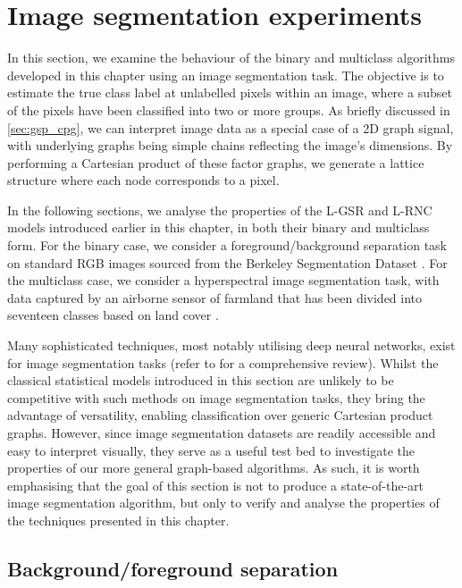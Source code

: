\section{Image segmentation experiments}

\label{sec:logistic_rnc_application}

In this section, we examine the behaviour of the binary and multiclass algorithms developed in this chapter using an image segmentation task. The objective is to estimate the true class label at unlabelled pixels within an image, where a subset of the pixels have been classified into two or more groups. As briefly discussed in \cref{sec:gsp_cpg}, we can interpret image data as a special case of a 2D graph signal, with underlying graphs being simple chains reflecting the image's dimensions. By performing a Cartesian product of these factor graphs, we generate a lattice structure where each node corresponds to a pixel.

In the following sections, we analyse the properties of the L-GSR and L-RNC models introduced earlier in this chapter, in both their binary and multiclass form. For the binary case, we consider a foreground/background separation task on standard RGB images sourced from the Berkeley Segmentation Dataset \citep{Martin2001}. For the multiclass case, we consider a hyperspectral image segmentation task, with data captured by an airborne sensor of farmland that has been divided into seventeen classes based on land cover \citep{Baumgardner2015}. 


Many sophisticated techniques, most notably utilising deep neural networks, exist for image segmentation tasks (refer to \cite{Minaee2022,Wang2022} for a comprehensive review). Whilst the classical statistical models introduced in this section are unlikely to be competitive with such methods on image segmentation tasks, they bring the advantage of versatility, enabling classification over generic Cartesian product graphs. However, since image segmentation datasets are readily accessible and easy to interpret visually, they serve as a useful test bed to investigate the properties of our more general graph-based algorithms. As such, it is worth emphasising that the goal of this section is not to produce a state-of-the-art image segmentation algorithm, but only to verify and analyse the properties of the techniques presented in this chapter. 


\subsection{Background/foreground separation}

